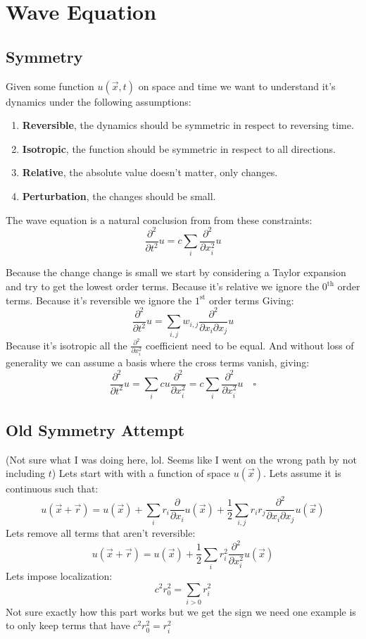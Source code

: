 
\section{Wave Equation}
\subsection{Symmetry}
Given some function $u(\vec{x},t)$ on space and time we want to understand it's dynamics under the following assumptions:
\begin{enumerate}
	\item {\textbf{Reversible}}, the dynamics should be symmetric in respect to reversing time.
	\item {\textbf{Isotropic}}, the function should be symmetric in respect to all directions.
	\item {\textbf{Relative}}, the absolute value doesn't matter, only changes.
	\item {\textbf{Perturbation}}, the changes should be small.
\end{enumerate}

The wave equation is a natural conclusion from from these constraints:
\[\frac{\partial^2}{\partial t^2}u = c\sum_i \frac{\partial^2}{\partial x_i^2} u\]

Because the change change is small we start by considering a Taylor expansion and try to get the lowest order terms.
Because it's relative we ignore the $0^\text{th}$ order terms.
Because it's reversible we ignore the $1^\text{st}$ order terms
Giving:
\[\frac{\partial^2}{\partial t^2}u = \sum_{i,j} w_{i,j}\frac{\partial^2}{\partial x_i \partial x_j} u\]
Because it's isotropic all the $\frac{\partial^2}{\partial x_i^2}$ coefficient need to be equal.
And without loss of generality we can assume a basis where the cross terms vanish, giving:
\[\frac{\partial^2}{\partial t^2}u = \sum_i cu\frac{\partial^2}{\partial x_i^2} = c\sum_i \frac{\partial^2}{\partial x_i^2} u\quad \square\]

\subsection{Old Symmetry Attempt}
(Not sure what I was doing here, lol. Seems like I went on the wrong path by not including $t$)
Lets start with with a function of space $u(\vec{x})$.
Lets assume it is continuous such that:
\[u(\vec{x} +\vec{r}) = u(\vec{x}) + \sum_{i}r_i\frac{\partial}{\partial x_i}u(\vec{x})+\frac{1}{2}\sum_{i,j}r_ir_j\frac{\partial^2}{\partial x_i\partial x_j}u(\vec{x}) \]
Lets remove all terms that aren't reversible:
\[u(\vec{x} +\vec{r}) = u(\vec{x}) + \frac{1}{2}\sum_{i}r_i^2\frac{\partial^2}{\partial x_i^2}u(\vec{x}) \]
Lets impose localization:
\[c^2r_0^2 = \sum_{i>0}r_i^2\]
Not sure exactly how this part works but we get the sign we need one example is to only keep terms that have $c^2r_0^2 = r_i^2$

